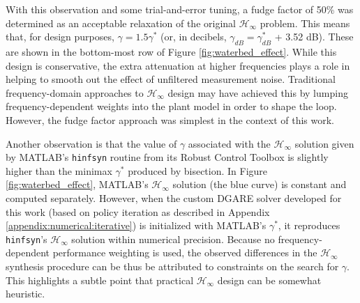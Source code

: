 With this observation and some trial-and-error tuning, a fudge factor of 50\% was determined as an acceptable relaxation of the original $\mathcal{H}_{\infty}$ problem.  This means that, for design purposes, $\gamma = 1.5\gamma^{*}$ (or, in decibels, $\gamma_{dB} = \gamma^{*}_{dB}$ + 3.52 dB).  These are shown in the bottom-most row of Figure \ref{fig:waterbed_effect}.  While this design is conservative, the extra attenuation at higher frequencies plays a role in helping to smooth out the effect of unfiltered measurement noise.  Traditional frequency-domain approaches to $\mathcal{H}_{\infty}$ design may have achieved this by lumping frequency-dependent weights into the plant model in order to shape the loop.  However, the fudge factor approach was simplest in the context of this work.

Another observation is that the value of $\gamma$ associated with the $\mathcal{H}_{\infty}$ solution given by MATLAB's \texttt{hinfsyn} routine from its Robust Control Toolbox is slightly higher than the minimax $\gamma^{*}$ produced by bisection.  In Figure \ref{fig:waterbed_effect}, MATLAB's $\mathcal{H}_{\infty}$ solution (the blue curve) is constant and computed separately.  However, when the custom DGARE solver developed for this work (based on policy iteration as described in Appendix \ref{appendix:numerical:iterative}) is initialized with MATLAB's $\gamma^{*}$, it reproduces \texttt{hinfsyn}'s $\mathcal{H}_{\infty}$ solution within numerical precision.  Because no frequency-dependent performance weighting is used, the observed differences in the $\mathcal{H}_{\infty}$ synthesis procedure can be thus be attributed to constraints on the search for $\gamma$.  This highlights a subtle point that practical $\mathcal{H}_{\infty}$ design can be somewhat heuristic.

